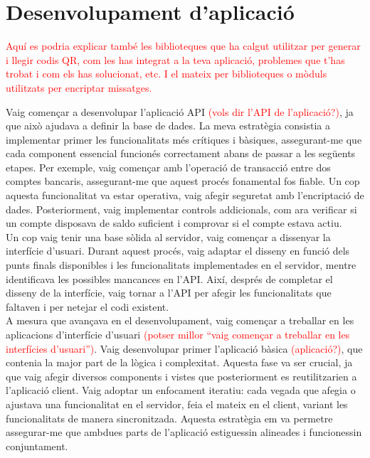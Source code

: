 \documentclass[a4paper,12pt,twoside]{ThesisStyle}
\newcommand{\pau}[1]{\textcolor{red}{#1}}
\begin{document}
\section{Desenvolupament d'aplicació}
\label{sec: Desenvolupament d'aplicació}

\pau{Aquí es podria explicar també les biblioteques que ha calgut utilitzar per generar i llegir codis QR, com les has integrat a la teva aplicació, problemes que t'has trobat i com els has solucionat, etc. I el mateix per biblioteques o mòduls utilitzats per encriptar missatges.}


Vaig començar a desenvolupar l'aplicació API \pau{(vols dir l'API de l'aplicació?)}, ja que això ajudava a definir la base de dades. La meva estratègia consistia a implementar primer les funcionalitats més crítiques i bàsiques, assegurant-me que cada component essencial funcionés correctament abans de passar a les següents etapes. Per exemple, vaig començar amb l'operació de transacció entre dos comptes bancaris, assegurant-me que aquest procés fonamental fos fiable. Un cop aquesta funcionalitat va estar operativa, vaig afegir seguretat amb l'encriptació de dades. Posteriorment, vaig implementar controls addicionals, com ara verificar si un compte disposava de saldo suficient i comprovar si el compte estava actiu.\\

Un cop vaig tenir una base sòlida al servidor, vaig començar a dissenyar la interfície d'usuari. Durant aquest procés, vaig adaptar el disseny en funció dels punts finals disponibles i les funcionalitats implementades en el servidor, mentre identificava les possibles mancances en l'API. Així, després de completar el disseny de la interfície, vaig tornar a l'API per afegir les funcionalitats que faltaven i per netejar el codi existent.\\

A mesura que avançava en el desenvolupament, vaig començar a treballar en les aplicacions d'interfície d'usuari \pau{(potser millor ``vaig començar a treballar en les interfícies d'usuari'')}. Vaig desenvolupar primer l'aplicació bàsica \pau{(aplicació?)}, que contenia la major part de la lògica i complexitat. Aquesta fase va ser crucial, ja que vaig afegir diversos components i vistes que posteriorment es reutilitzarien a l'aplicació client. Vaig adoptar un enfocament iteratiu: cada vegada que afegia o ajustava una funcionalitat en el servidor, feia el mateix en el client, variant les funcionalitats de manera sincronitzada. Aquesta estratègia em va permetre assegurar-me que ambdues parts de l'aplicació estiguessin alineades i funcionessin conjuntament.\\
\end{document}
